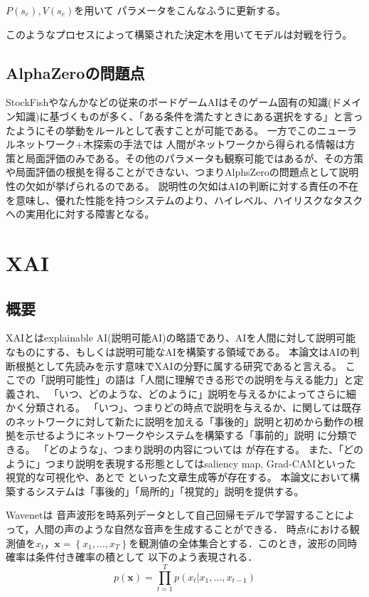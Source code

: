 $P(s_e), V(s_e)$を用いて
パラメータをこんなふうに更新する。

このようなプロセスによって構築された決定木を用いてモデルは対戦を行う。
\subsection{AlphaZeroの問題点}
StockFish\cite{oord2016wavenet}やなんか\cite{oord2016wavenet}などの従来のボードゲームAIはそのゲーム固有の知識(ドメイン知識)に基づくものが多く、「ある条件を満たすときにある選択をする」と言ったようにその挙動をルールとして表すことが可能である。
一方でこのニューラルネットワーク+木探索の手法では
人間がネットワークから得られる情報は方策と局面評価のみである。その他のパラメータも観察可能ではあるが、その方策や局面評価の根拠を得ることができない、つまりAlphsZeroの問題点として説明性の欠如が挙げられるのである。
説明性の欠如はAIの判断に対する責任の不在を意味し、優れた性能を持つシステムのより、ハイレベル、ハイリスクなタスクへの実用化に対する障害となる。



\section{XAI}

\subsection{概要}
XAIとはexplainable AI(説明可能AI)の略語であり、AIを人間に対して説明可能なものにする、もしくは説明可能なAIを構築する領域である。
本論文はAIの判断根拠として先読みを示す意味でXAIの分野に属する研究であると言える。
ここでの「説明可能性」の語は「人間に理解できる形での説明を与える能力」\cite{oord2016wavenet}と定義され、
「いつ、どのような、どのように」説明を与えるかによってさらに細かく分類される。
「いつ」、つまりどの時点で説明を与えるか、に関しては既存のネットワークに対して新たに説明を加える「事後的」説明と初めから動作の根拠を示せるようにネットワークやシステムを構築する「事前的」説明
に分類できる\cite{oord2016wavenet}。
「どのような」、つまり説明の内容については
が存在する。
また、「どのように」つまり説明を表現する形態としてはsaliency map, Grad-CAM\cite{oord2016wavenet}といった視覚的な可視化や、あとで
\cite{oord2016wavenet}といった文章生成等が存在する。
本論文において構築するシステムは「事後的」「局所的」「視覚的」説明を提供する。

Wavenet\cite{oord2016wavenet}は
音声波形を時系列データとして自己回帰モデルで学習することによって，人間の声のような自然な音声を生成することができる．
時点$t$における観測値を$x_t$，$\bm{x} = \left\{ x_1, ..., x_T \right\}$を観測値の全体集合とする．このとき，波形の同時確率は条件付き確率の積として
以下のよう表現される．
\begin{equation}
	p(\bm{x}) = \prod_{t=1}^T p(x_t | x_1, ..., x_{t-1})
\end{equation}

